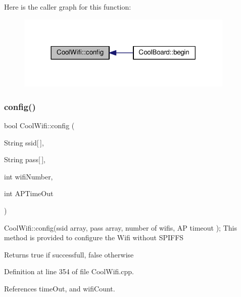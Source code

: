 Here is the caller graph for this function\+:
\nopagebreak
\begin{figure}[H]
\begin{center}
\leavevmode
\includegraphics[width=294pt]{classCoolWifi_a4eb2f6b9b09dd588964b88b6c70122c0_icgraph}
\end{center}
\end{figure}
\mbox{\label{classCoolWifi_a871d4a0d9978f17fdf6d874fc2958b6c}} 
\subsubsection{\texorpdfstring{config()}{config()}\hspace{0.1cm}{\footnotesize\ttfamily [2/2]}}
{\footnotesize\ttfamily bool Cool\+Wifi\+::config (\begin{DoxyParamCaption}\item[{String}]{ssid\mbox{[}$\,$\mbox{]},  }\item[{String}]{pass\mbox{[}$\,$\mbox{]},  }\item[{int}]{wifi\+Number,  }\item[{int}]{A\+P\+Time\+Out }\end{DoxyParamCaption})}

Cool\+Wifi\+::config(ssid array, pass array, number of wifis, A\+P timeout ); This method is provided to configure the Wifi without S\+P\+I\+F\+FS

\begin{DoxyReturn}{Returns}
true if successfull, false otherwise 
\end{DoxyReturn}


Definition at line 354 of file Cool\+Wifi.\+cpp.



References time\+Out, and wifi\+Count.


